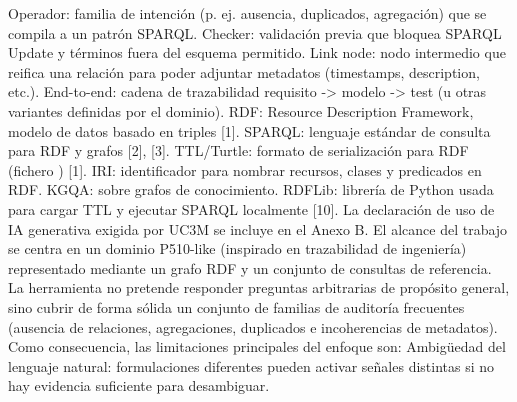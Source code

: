 \markdownRendererUlItem Operador: familia de intención (p. ej. ausencia, duplicados, agregación) que se compila a un patrón SPARQL.\markdownRendererUlItemEnd 
\markdownRendererUlItem Checker: validación previa que bloquea SPARQL Update y términos fuera del esquema permitido.\markdownRendererUlItemEnd 
\markdownRendererUlItem Link node: nodo intermedio que reifica una relación para poder adjuntar metadatos (timestamps, description, etc.).\markdownRendererUlItemEnd 
\markdownRendererUlItem End-to-end: cadena de trazabilidad requisito -> modelo -> test (u otras variantes definidas por el dominio).\markdownRendererUlItemEnd 
\markdownRendererUlEndTight \markdownRendererInterblockSeparator
{}\markdownRendererInterblockSeparator
{}\markdownRendererUlBeginTight
\markdownRendererUlItem RDF: Resource Description Framework, modelo de datos basado en triples [1].\markdownRendererUlItemEnd 
\markdownRendererUlItem SPARQL: lenguaje estándar de consulta para RDF y grafos [2], [3].\markdownRendererUlItemEnd 
\markdownRendererUlItem TTL/Turtle: formato de serialización para RDF (fichero ) [1].\markdownRendererUlItemEnd 
\markdownRendererUlItem IRI: identificador para nombrar recursos, clases y predicados en RDF.\markdownRendererUlItemEnd 
\markdownRendererUlItem KGQA:  sobre grafos de conocimiento.\markdownRendererUlItemEnd 
\markdownRendererUlItem RDFLib: librería de Python usada para cargar TTL y ejecutar SPARQL localmente [10].\markdownRendererUlItemEnd 
\markdownRendererUlEndTight \markdownRendererInterblockSeparator
{}La declaración de uso de IA generativa exigida por UC3M se incluye en el Anexo B.\markdownRendererInterblockSeparator
{}\markdownRendererInterblockSeparator
{}El alcance del trabajo se centra en un dominio P510-like (inspirado en trazabilidad de ingeniería) representado mediante un grafo RDF y un conjunto de consultas de referencia. La herramienta no pretende responder preguntas arbitrarias de propósito general, sino cubrir de forma sólida un conjunto de familias de auditoría frecuentes (ausencia de relaciones, agregaciones, duplicados e incoherencias de metadatos).\markdownRendererInterblockSeparator
{}Como consecuencia, las limitaciones principales del enfoque son:\markdownRendererInterblockSeparator
{}\markdownRendererUlBeginTight
\markdownRendererUlItem Ambigüedad del lenguaje natural: formulaciones diferentes pueden activar señales distintas si no hay evidencia suficiente para desambiguar.\markdownRendererUlItemEnd 

